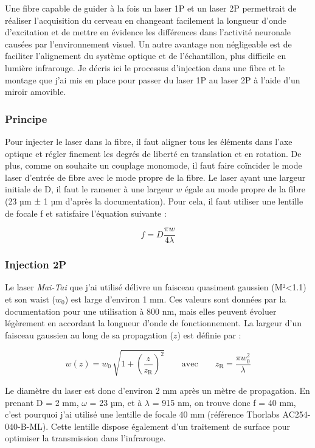 
Une fibre capable de guider à la fois un laser 1P et un laser 2P permettrait de réaliser l'acquisition du cerveau en changeant facilement la longueur d'onde d'excitation et de mettre en évidence les différences dans l'activité neuronale causées par l'environnement visuel. Un autre avantage non négligeable est de faciliter l'alignement du système optique et de l'échantillon, plus difficile en lumière infrarouge. Je décris ici le processus d'injection dans une fibre et le montage que j'ai mis en place pour passer du laser 1P au laser 2P à l'aide d'un miroir amovible. 

\subsubsection{Principe}

Pour injecter le laser dans la fibre, il faut aligner tous les éléments dans l'axe optique et régler finement les degrés de liberté en translation et en rotation. De plus, comme on souhaite un couplage monomode, il faut faire coïncider le mode laser d'entrée de fibre avec le mode propre de la fibre. Le laser ayant une largeur initiale de D, il faut le ramener à une largeur $w$ égale au mode propre de la fibre (23 µm ± 1 µm d'après la documentation). Pour cela, il faut utiliser une lentille de focale f et satisfaire l'équation suivante :

$$
f = D\frac{\pi w}{4\lambda}
$$

\subsubsection{Injection 2P}

Le laser \emph{Mai-Tai} que j'ai utilisé délivre un faisceau quasiment gaussien (M²<1.1) et son waist ($w_0$) est large d'environ 1 mm. Ces valeurs sont données par la documentation pour une utilisation à 800 nm, mais elles peuvent évoluer légèrement en accordant la longueur d'onde de fonctionnement. La largeur d'un faisceau gaussien au long de sa propagation ($z$) est définie par :

$$
w(z) = w_0 \, \sqrt{ 1+ {\left( \frac{z}{z_\mathrm{R}} \right)}^2 } \qquad \text{avec} \qquad
z_\mathrm{R} = \frac{\pi w_0^2 }{\lambda}
$$

Le diamètre du laser est donc d'environ 2 mm après un mètre de propagation. En prenant D = 2 mm, $\omega$ = 23 µm, et à $\lambda$ = 915 nm, on trouve donc f = 40 mm, c'est pourquoi j'ai utilisé une lentille de focale 40 mm (référence Thorlabs AC254-040-B-ML). Cette lentille dispose également d'un traitement de surface pour optimiser la transmission dans l'infrarouge.

